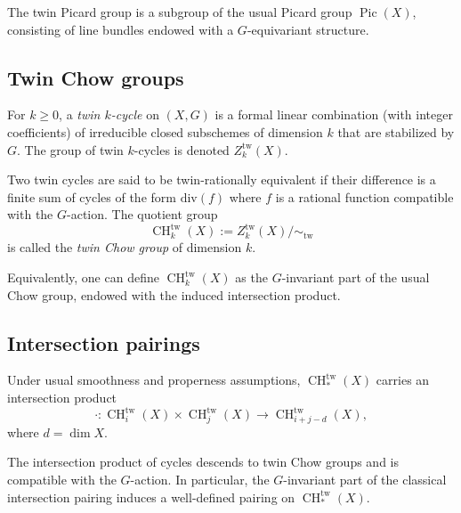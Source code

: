 \documentclass[11pt,a4paper]{article}
\numberwithin{equation}{section}
\DeclareMathOperator{\Pic}{Pic}
\DeclareMathOperator{\CH}{CH}
\newcommand{\TwinScheme}{(X,G)}
\begin{document}
	\begin{remark}
		The twin Picard group is a subgroup of the usual Picard group $\Pic(X)$, 
		consisting of line bundles endowed with a $G$-equivariant structure.
	\end{remark}
	
	\subsection{Twin Chow groups}
	
	\begin{definition}
		For $k\ge 0$, a \emph{twin $k$-cycle} on $\TwinScheme$ is a formal linear combination (with integer coefficients)
		of irreducible closed subschemes of dimension $k$ that are stabilized by $G$.
		The group of twin $k$-cycles is denoted $Z_k^{\mathrm{tw}}(X)$.
	\end{definition}
	
	\begin{definition}
		Two twin cycles are said to be twin-rationally equivalent if their difference is a finite sum of cycles of 
		the form $\mathrm{div}(f)$ where $f$ is a rational function compatible with the $G$-action.
		The quotient group
		\[
		\CH_k^{\mathrm{tw}}(X) := Z_k^{\mathrm{tw}}(X)/\sim_{\mathrm{tw}}
		\]
		is called the \emph{twin Chow group} of dimension $k$.
	\end{definition}
	
	\begin{remark}
		Equivalently, one can define $\CH_k^{\mathrm{tw}}(X)$ as the $G$-invariant part of the usual Chow group,
		endowed with the induced intersection product.
	\end{remark}
	
	\subsection{Intersection pairings}
	
	Under usual smoothness and properness assumptions, $\CH_*^{\mathrm{tw}}(X)$ carries an intersection product
	\[
	\cdot : \CH_i^{\mathrm{tw}}(X)\times \CH_j^{\mathrm{tw}}(X) \to \CH_{i+j-d}^{\mathrm{tw}}(X),
	\]
	where $d=\dim X$.
	
	\begin{proposition}
		The intersection product of cycles descends to twin Chow groups and is compatible with the $G$-action.
		In particular, the $G$-invariant part of the classical intersection pairing induces a well-defined pairing on
		$\CH_*^{\mathrm{tw}}(X)$.
	\end{proposition}
	
\end{document}
